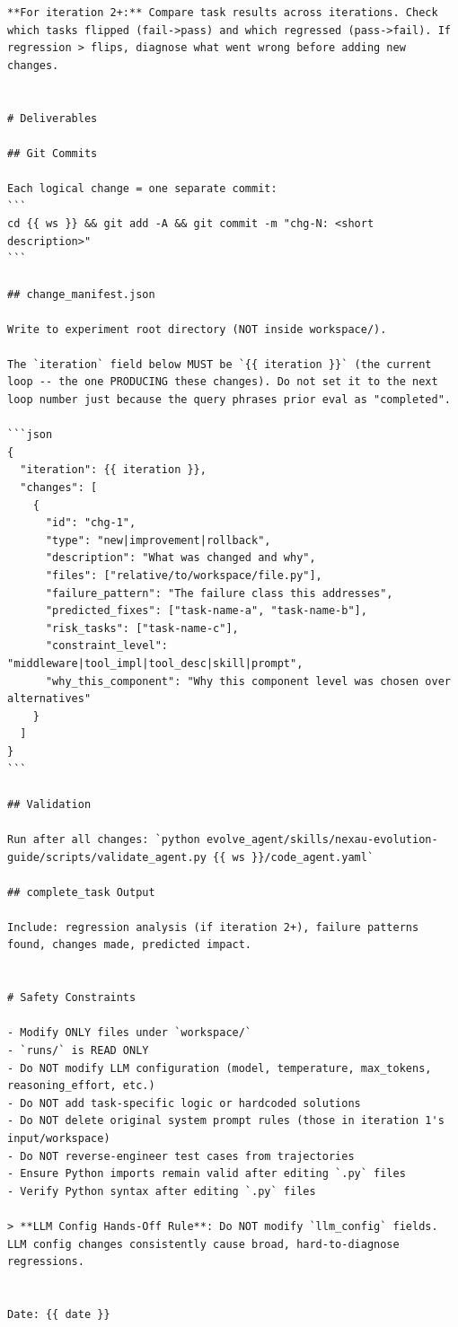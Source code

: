 \begin{tcolorbox}
\begin{lstlisting}
**For iteration 2+:** Compare task results across iterations. Check which tasks flipped (fail->pass) and which regressed (pass->fail). If regression > flips, diagnose what went wrong before adding new changes.


# Deliverables

## Git Commits

Each logical change = one separate commit:
```
cd {{ ws }} && git add -A && git commit -m "chg-N: <short description>"
```

## change_manifest.json

Write to experiment root directory (NOT inside workspace/).

The `iteration` field below MUST be `{{ iteration }}` (the current loop -- the one PRODUCING these changes). Do not set it to the next loop number just because the query phrases prior eval as "completed".

```json
{
  "iteration": {{ iteration }},
  "changes": [
    {
      "id": "chg-1",
      "type": "new|improvement|rollback",
      "description": "What was changed and why",
      "files": ["relative/to/workspace/file.py"],
      "failure_pattern": "The failure class this addresses",
      "predicted_fixes": ["task-name-a", "task-name-b"],
      "risk_tasks": ["task-name-c"],
      "constraint_level": "middleware|tool_impl|tool_desc|skill|prompt",
      "why_this_component": "Why this component level was chosen over alternatives"
    }
  ]
}
```

## Validation

Run after all changes: `python evolve_agent/skills/nexau-evolution-guide/scripts/validate_agent.py {{ ws }}/code_agent.yaml`

## complete_task Output

Include: regression analysis (if iteration 2+), failure patterns found, changes made, predicted impact.


# Safety Constraints

- Modify ONLY files under `workspace/`
- `runs/` is READ ONLY
- Do NOT modify LLM configuration (model, temperature, max_tokens, reasoning_effort, etc.)
- Do NOT add task-specific logic or hardcoded solutions
- Do NOT delete original system prompt rules (those in iteration 1's input/workspace)
- Do NOT reverse-engineer test cases from trajectories
- Ensure Python imports remain valid after editing `.py` files
- Verify Python syntax after editing `.py` files

> **LLM Config Hands-Off Rule**: Do NOT modify `llm_config` fields. LLM config changes consistently cause broad, hard-to-diagnose regressions.


Date: {{ date }}
\end{lstlisting}
\end{tcolorbox}

